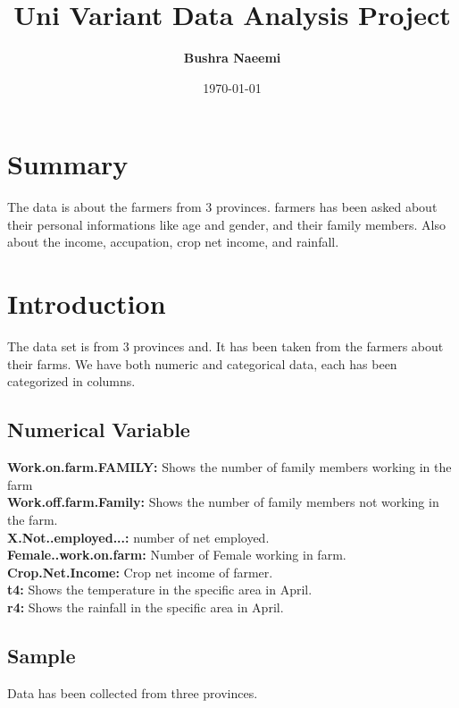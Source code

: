 \documentclass[12pt, a4paper]{article}
\begin{document}
\title{Uni Variant Data Analysis Project}
\author{\textbf {Bushra Naeemi}}
\date{\today}
\maketitle
\newpage
\tableofcontents
\newpage
\section{Summary}
The data is about the farmers from 3 provinces. farmers has been asked about their personal informations like age and gender, and their family members. Also about the income, accupation, crop net income, and rainfall.  
\section{Introduction}
\justify
The data set is from 3 provinces and. It has been taken from the farmers about their farms. We have both numeric and categorical data, each has been categorized in columns.


\subsection{Numerical Variable}
\textbf{Work.on.farm.FAMILY:} Shows the number of family members working in the farm \\
\textbf{Work.off.farm.Family:} Shows the number of family members not working in the farm.\\
\textbf{X.Not..employed...:} number of net employed.\\
\textbf{Female..work.on.farm:} Number of Female working in farm.\\
\textbf{Crop.Net.Income:} Crop net income of farmer.\\
\textbf{t4:} Shows the temperature in the specific area in April.\\
\textbf{r4:} Shows the rainfall in the specific area in April.\\
\subsection{Sample}
Data has been collected from three provinces. 
\end{document}
